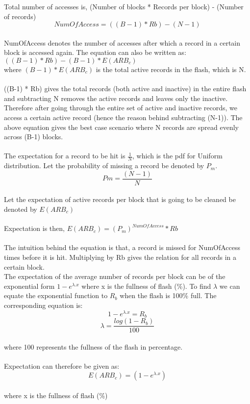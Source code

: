 \documentclass[11pt]{report} %
\begin{document}
Total number of accesses is, (Number of blocks * Records per block) - (Number of records)\\
\begin{equation}NumOfAccess = ((B-1) * Rb) -  (N-1)\end{equation}\\
NumOfAccess denotes the number of accesses after which a record in a certain block is accessed again. The equation can also be written as: $((B-1) * Rb) - (B-1) * E(ARB_c)$\\
where $(B-1) * E(ARB_c)$ is the total active records in the flash, which is N.\\
\\

((B-1) * Rb) gives the total records (both active and inactive) in the entire flash and subtracting N removes the active records and leaves only the inactive. Therefore after going through the entire set of active and inactive records, we access a certain active record (hence the reason behind subtracting (N-1)). The above equation gives the best case scenario where N records are spread evenly across (B-1) blocks.\\
\\

The expectation for a record to be hit is $\frac{1}{N}$, which is the pdf for Uniform distribution. Let the probability of missing a record be denoted by $P_m$. 
\begin{equation}Pm = \frac{(N-1)}{N}\end{equation}\\
Let the expectation of active records per block that is going to be cleaned be denoted by $E(ARB_c)$\\
\\

Expectation is then, $E(ARB_c) = (P_m)^{NumOfAccess} * Rb$\\
\\
The intuition behind the equation is that, a record is missed for NumOfAccess times before it is hit. Multiplying by Rb gives the relation for all records in a certain block.\\


The expectation of the average number of records per block can be of the exponential form $1-e^{\lambda . x}$ where x is the fullness of flash (\%). To find $\lambda$ we can equate the exponential function to $R_b$ when the flash is 100\% full. 
The corresponding equation is:
$$1-e^{\lambda . x} = R_b$$
$$\lambda = \frac{log(1 - R_b)}{100}$$\\
where 100 represents the fullness of the flash in percentage.\\
\\
Expectation can therefore be given as: $$E(ARB_c) = (1 - e^{\lambda . x})$$\\
where x is the fullness of flash (\%)
\\
\end{document}
